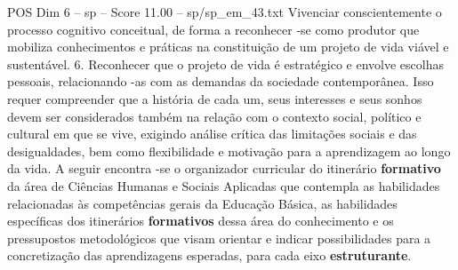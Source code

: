 \begin{textsample}{POS Dim 6 – sp – Score 11.00 – sp/sp\_em\_43.txt}
Vivenciar conscientemente o processo cognitivo conceitual, de forma a reconhecer -se como produtor que mobiliza conhecimentos e práticas na constituição de um projeto de vida viável e sustentável. 6.
Reconhecer que o projeto de vida é estratégico e envolve escolhas pessoais, relacionando -as com as demandas da sociedade contemporânea.
Isso requer compreender que a história de cada um, seus interesses e seus sonhos devem ser considerados também na relação com o contexto social, político e cultural em que se vive, exigindo análise crítica das limitações sociais e das desigualdades, bem como flexibilidade e motivação para a aprendizagem ao longo da vida.
A seguir encontra -se o organizador curricular do itinerário \textbf{formativo} da área de Ciências Humanas e Sociais Aplicadas que contempla as habilidades relacionadas às competências gerais da Educação Básica, as habilidades específicas dos itinerários \textbf{formativos} dessa área do conhecimento e os pressupostos metodológicos que visam orientar e indicar possibilidades para a concretização das aprendizagens esperadas, para cada eixo \textbf{estruturante}.

\end{textsample}
